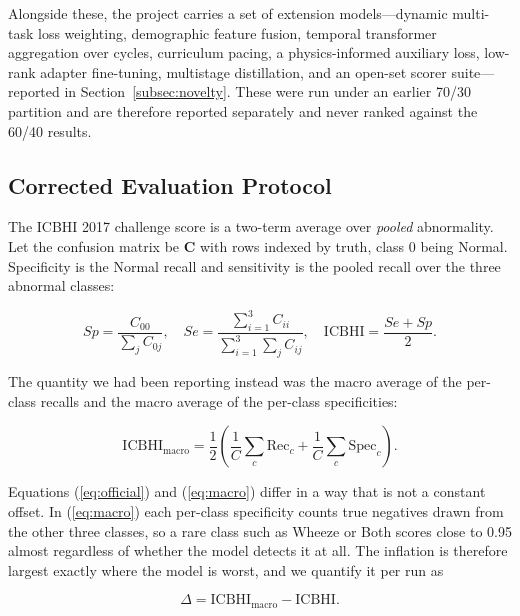 \documentclass[journal,onecolumn]{IEEEtran}
\begin{document}
Alongside these, the project carries a set of extension models---dynamic multi-task
loss weighting, demographic feature fusion, temporal transformer aggregation over
cycles, curriculum pacing, a physics-informed auxiliary loss, low-rank adapter
fine-tuning, multistage distillation, and an open-set scorer suite---reported in
Section~\ref{subsec:novelty}. These were run under an earlier 70/30 partition and are
therefore reported separately and never ranked against the 60/40 results.

\subsection{Corrected Evaluation Protocol}
\label{subsec:protocol}

The ICBHI 2017 challenge score is a two-term average over \emph{pooled} abnormality.
Let the confusion matrix be $\mathbf{C}$ with rows indexed by truth, class $0$ being
Normal. Specificity is the Normal recall and sensitivity is the pooled recall over
the three abnormal classes:

\begin{equation}
\label{eq:official}
Sp = \frac{C_{00}}{\sum_{j} C_{0j}},
\quad
Se = \frac{\sum_{i=1}^{3} C_{ii}}{\sum_{i=1}^{3}\sum_{j} C_{ij}},
\quad
\mathrm{ICBHI} = \frac{Se + Sp}{2}.
\end{equation}

The quantity we had been reporting instead was the macro average of the per-class
recalls and the macro average of the per-class specificities:

\begin{equation}
\label{eq:macro}
\mathrm{ICBHI}_{\text{macro}}
= \frac{1}{2}\left( \frac{1}{C}\sum_{c} \mathrm{Rec}_c + \frac{1}{C}\sum_{c} \mathrm{Spec}_c \right).
\end{equation}

Equations (\ref{eq:official}) and (\ref{eq:macro}) differ in a way that is not a
constant offset. In (\ref{eq:macro}) each per-class specificity counts true negatives
drawn from the other three classes, so a rare class such as Wheeze or Both scores
close to 0.95 almost regardless of whether the model detects it at all. The
inflation is therefore largest exactly where the model is worst, and we quantify it
per run as

\begin{equation}
\label{eq:delta}
\Delta = \mathrm{ICBHI}_{\text{macro}} - \mathrm{ICBHI}.
\end{equation}
\end{document}
